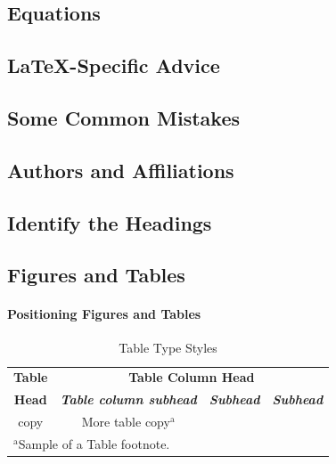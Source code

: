 \documentclass[conference]{IEEEtran}
\begin{document}
\subsection{Equations}

\subsection{\LaTeX-Specific Advice}


\subsection{Some Common Mistakes}
\cite{IEEEexample:article_typical}
\subsection{Authors and Affiliations}


\subsection{Identify the Headings}

\subsection{Figures and Tables}
\paragraph{Positioning Figures and Tables}

\begin{table}[htbp]
    \caption{Table Type Styles}
    \begin{center}
        \begin{tabular}{|c|c|c|c|}
            \hline
            \textbf{Table} & \multicolumn{3}{|c|}{\textbf{Table Column Head}}                                                         \\
            \cline{2-4}
            \textbf{Head}  & \textbf{\textit{Table column subhead}}           & \textbf{\textit{Subhead}} & \textbf{\textit{Subhead}} \\
            \hline
            copy           & More table copy$^{\mathrm{a}}$                   &                           &                           \\
            \hline
            \multicolumn{4}{l}{$^{\mathrm{a}}$Sample of a Table footnote.}
        \end{tabular}
        \label{tab1}
    \end{center}
\end{table}
\end{document}
